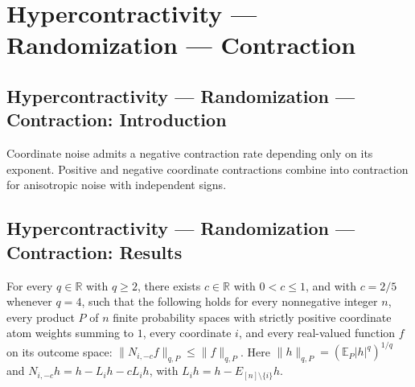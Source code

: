 \section{Hypercontractivity --- Randomization --- Contraction}
\subsection*{Hypercontractivity --- Randomization --- Contraction: Introduction}
Coordinate noise admits a negative contraction rate depending only on its exponent. Positive and negative coordinate contractions combine into contraction for anisotropic noise with independent signs.

\subsection*{Hypercontractivity --- Randomization --- Contraction: Results}

\begin{theorem}
\leanok
{}
For every $q\in\mathbb R$ with $q\ge2$, there exists $c\in\mathbb R$ with $0<c\le1$, and
with $c=2/5$ whenever $q=4$, such that the following holds for every nonnegative integer
$n$, every product $P$ of $n$ finite probability spaces with strictly positive
coordinate atom weights summing to $1$, every coordinate $i$, and every real-valued
function $f$ on its outcome space: $\|N_{i,-c}f\|_{q,P}\le\|f\|_{q,P}$. Here
$\|h\|_{q,P}=(\mathbb E_P|h|^q)^{1/q}$ and $N_{i,-c}h=h-L_i h-cL_i h$, with $L_i
h=h-E_{[n]\setminus\{i\}}h$.
\end{theorem}

